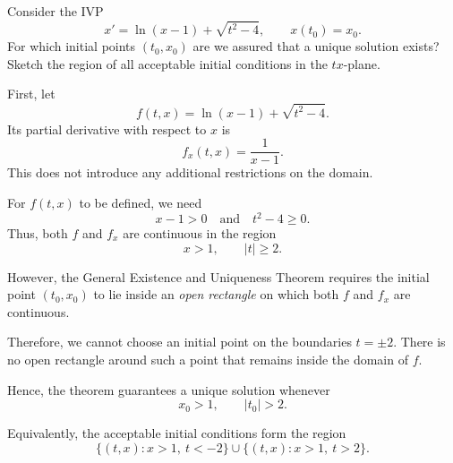 \documentclass[11pt,letterpaper]{article}
\begin{document}
    

\begin{example}[2]{
    
Consider the IVP
$$
x' = \ln(x-1)+\sqrt{t^2-4}, \qquad x(t_0)=x_0.
$$
For which initial points $(t_0,x_0)$ are we assured that a unique solution exists? Sketch the region of all acceptable initial conditions in the $tx$-plane.
}

First, let
\[
f(t,x)=\ln(x-1)+\sqrt{t^2-4}.
\]
Its partial derivative with respect to $x$ is
\[
f_x(t,x)=\frac{1}{x-1}.
\]
This does not introduce any additional restrictions on the domain.

For $f(t,x)$ to be defined, we need
\[
x-1>0 \quad \text{and} \quad 
t^2-4\geq0.
\]
Thus, both $f$ and $f_x$ are continuous in the region
\[
x>1,\qquad |t|\geq2.
\]

However, the General Existence and Uniqueness Theorem requires the initial
point $(t_0,x_0)$ to lie inside an \emph{open rectangle} on which both
$f$ and $f_x$ are continuous.

Therefore, we cannot choose an initial point on the boundaries $t=\pm2$.
There is no open rectangle around such a point that remains inside the
domain of $f$.

Hence, the theorem guarantees a unique solution whenever
\[
x_0>1,\qquad |t_0|>2.
\]

Equivalently, the acceptable initial conditions form the region
\[
\{(t,x):x>1,\ t<-2\}
\cup
\{(t,x):x>1,\ t>2\}.
\]
\begin{figure}[H]
\centering
{}

\end{figure}
\end{example}
\end{document}
